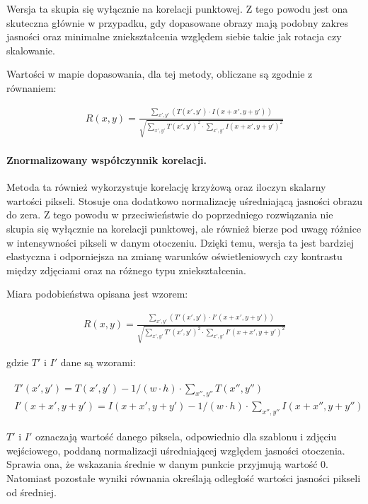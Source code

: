Wersja ta skupia się wyłącznie na korelacji punktowej. Z tego powodu jest ona skuteczna głównie w przypadku, gdy dopasowane obrazy mają podobny zakres jasności oraz minimalne zniekształcenia względem siebie takie jak rotacja czy skalowanie.

Wartości w mapie dopasowania, dla tej metody, obliczane są zgodnie z równaniem:

\begin{align*}
    R(x,y)= \frac{\sum_{x',y'} (T(x',y') \cdot I(x+x',y+y'))}{\sqrt{\sum_{x',y'}T(x',y')^2 \cdot \sum_{x',y'} I(x+x',y+y')^2}}
\end{align*}



\paragraph{Znormalizowany współczynnik korelacji.}
Metoda ta również wykorzystuje korelację krzyżową oraz iloczyn skalarny wartości pikseli. Stosuje ona dodatkowo normalizację uśredniającą jasności obrazu do zera. Z tego powodu w przeciwieństwie do poprzedniego rozwiązania nie skupia się wyłącznie na korelacji punktowej, ale również bierze pod uwagę różnice w intensywności pikseli w danym otoczeniu. Dzięki temu, wersja ta jest bardziej elastyczna i odporniejsza na zmianę warunków oświetleniowych czy kontrastu między zdjęciami oraz na różnego typu zniekształcenia.  

Miara podobieństwa opisana jest wzorem:

\begin{align*}
    R(x,y)= \frac{ \sum_{x',y'} (T'(x',y') \cdot I'(x+x',y+y')) }{ \sqrt{\sum_{x',y'}T'(x',y')^2 \cdot \sum_{x',y'} I'(x+x',y+y')^2} }
\end{align*}

gdzie $T'$ i $I'$ dane są wzorami:

\begin{align*}
    \begin{array}{c}
        T'(x',y')=T(x',y') - 1/(w \cdot h) \cdot \sum _{x'',y''} T(x'',y'') \\ 
        I'(x+x',y+y')=I(x+x',y+y') - 1/(w \cdot h) \cdot \sum _{x'',y''} I(x+x'',y+y'') 
    \end{array}
\end{align*}

$T'$ i $I'$ oznaczają wartość danego piksela, odpowiednio dla szablonu i zdjęciu wejściowego, poddaną normalizacji uśredniającej względem jasności otoczenia. Sprawia ona, że wskazania średnie w danym punkcie przyjmują wartość $0$. Natomiast pozostałe wyniki równania określają odległość wartości jasności pikseli od średniej.



